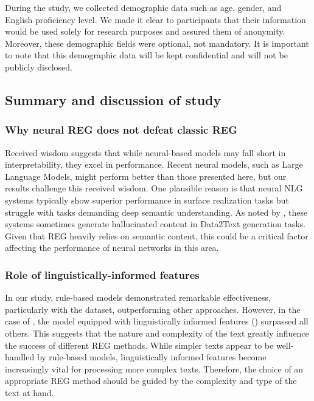 During the study, we collected demographic data such as age, gender, and English proficiency level. We made it clear to participants that their information would be used solely for research purposes and assured them of anonymity. Moreover, these demographic fields were optional, not mandatory. It is important to note that this demographic data will be kept confidential and will not be publicly disclosed.




\subsection{Summary and discussion of study \studF}\label{sec:discussion}



\subsubsection{Why neural REG does not defeat classic REG}

Received wisdom suggests that while neural-based models may fall short in interpretability, they excel in performance. Recent neural models, such as Large Language Models, might perform better than those presented here, but our results challenge this received wisdom.
One plausible reason is that neural NLG systems typically show superior performance in surface realization tasks but struggle with tasks demanding deep semantic understanding. As noted by \citet{hallucination2018}, these systems sometimes generate hallucinated content in Data2Text generation tasks. Given that REG heavily relies on semantic content, this could be a critical factor affecting the performance of neural networks in this area.

\subsubsection{Role of linguistically-informed features}
In our study, rule-based models demonstrated remarkable effectiveness, particularly with the \webnlg dataset, outperforming other approaches. However, in the case of \wsj, the model equipped with linguistically informed features () surpassed all others. This suggests that the nature and complexity of the text greatly influence the success of different REG methods. While simpler texts appear to be well-handled by rule-based models, linguistically informed features become increasingly vital for processing more complex texts. Therefore, the choice of an appropriate REG method should be guided by the complexity and type of the text at hand.



